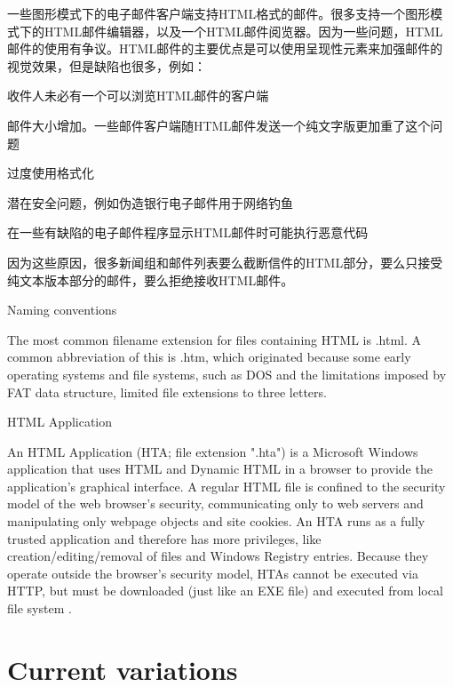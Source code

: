 \begin{compactitem}
一些图形模式下的电子邮件客户端支持HTML格式的邮件。很多支持一个图形模式下的HTML邮件编辑器，以及一个HTML邮件阅览器。因为一些问题，HTML邮件的使用有争议。HTML邮件的主要优点是可以使用呈现性元素来加强邮件的视觉效果，但是缺陷也很多，例如：

\begin{compactitem}
\item 收件人未必有一个可以浏览HTML邮件的客户端
\item 邮件大小增加。一些邮件客户端随HTML邮件发送一个纯文字版更加重了这个问题
\item 过度使用格式化
\item 潜在安全问题，例如伪造银行电子邮件用于网络钓鱼
\item 在一些有缺陷的电子邮件程序显示HTML邮件时可能执行恶意代码
\end{compactitem}

因为这些原因，很多新闻组和邮件列表要么截断信件的HTML部分，要么只接受纯文本版本部分的邮件，要么拒绝接收HTML邮件。

\item Naming conventions

The most common filename extension for files containing HTML is .html. A common abbreviation of this is .htm, which originated because some early operating systems and file systems, such as DOS and the limitations imposed by FAT data structure, limited file extensions to three letters.

\item HTML Application

An HTML Application (HTA; file extension ".hta") is a Microsoft Windows application that uses HTML and Dynamic HTML in a browser to provide the application's graphical interface. A regular HTML file is confined to the security model of the web browser's security, communicating only to web servers and manipulating only webpage objects and site cookies. An HTA runs as a fully trusted application and therefore has more privileges, like creation/editing/removal of files and Windows Registry entries. Because they operate outside the browser's security model, HTAs cannot be executed via HTTP, but must be downloaded (just like an EXE file) and executed from local file system .

\end{compactitem}





\chapter{Current variations}

